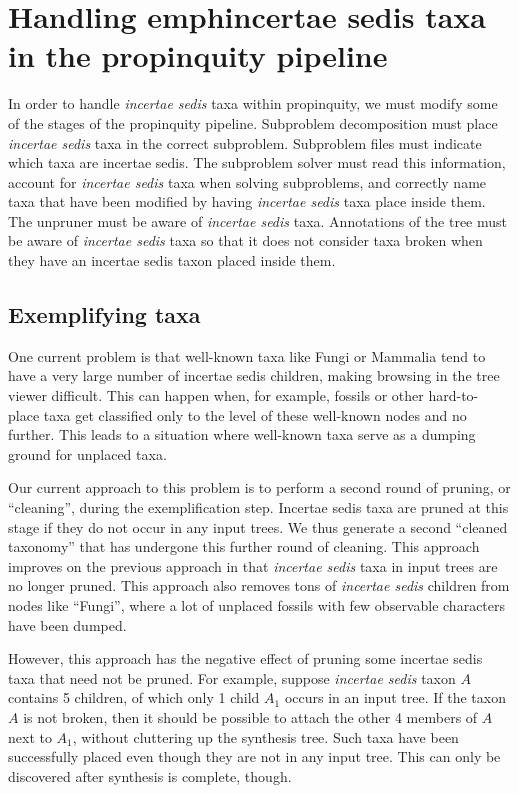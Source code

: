 \documentclass[english]{article}
\begin{document}
\section{Handling emph{incertae sedis} taxa in the propinquity
pipeline}

In order to handle \emph{incertae sedis} taxa within propinquity, we
must modify some of the stages of the propinquity pipeline. Subproblem
decomposition must place \emph{incertae sedis} taxa in the correct
subproblem. Subproblem files must indicate which taxa are incertae
sedis. The subproblem solver must read this information, account for
\emph{incertae sedis} taxa when solving subproblems, and correctly
name taxa that have been modified by having \emph{incertae sedis} taxa
place inside them. The unpruner must be aware of \emph{incertae sedis}
taxa. Annotations of the tree must be aware of \emph{incertae sedis}
taxa so that it does not consider taxa broken when they have an
incertae sedis taxon placed inside them.

\subsection{Exemplifying taxa}

One current problem is that well-known taxa like Fungi or Mammalia
tend to have a very large number of incertae sedis children, making
browsing in the tree viewer difficult. This can happen when, for
example, fossils or other hard-to- place taxa get classified only to
the level of these well-known nodes and no further. This leads to a
situation where well-known taxa serve as a dumping ground for unplaced
taxa.

Our current approach to this problem is to perform a second round of
pruning, or ``cleaning'', during the exemplification step. Incertae
sedis taxa are pruned at this stage if they do not occur in any input
trees. We thus generate a second ``cleaned taxonomy'' that has
undergone this further round of cleaning. This approach improves on
the previous approach in that \emph{incertae sedis} taxa in input
trees are no longer pruned. This approach also removes tons of
\emph{incertae sedis} children from nodes like ``Fungi'', where a lot
of unplaced fossils with few observable characters have been dumped.

However, this approach has the negative effect of pruning some
incertae sedis taxa that need not be pruned. For example, suppose
\emph{incertae sedis} taxon $A$ contains 5 children, of which only 1
child $A_{1}$ occurs in an input tree. If the taxon $A$ is not broken,
then it should be possible to attach the other 4 members of $A$ next
to $A_{1}$, without cluttering up the synthesis tree. Such taxa have
been successfully placed even though they are not in any input tree.
This can only be discovered after synthesis is complete, though.
\end{document}
